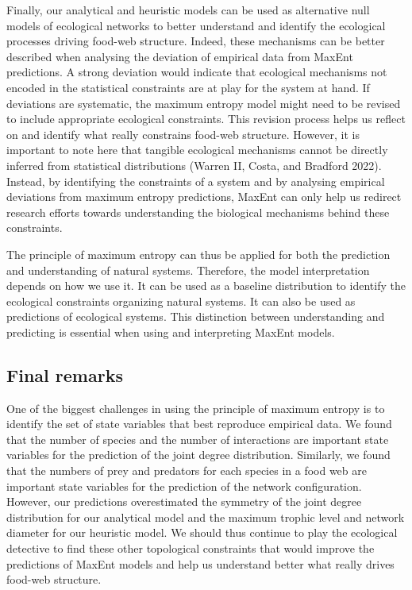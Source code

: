 \documentclass[11pt]{article}
\begin{document}
Finally, our analytical and heuristic models can be used as alternative
null models of ecological networks to better understand and identify the
ecological processes driving food-web structure. Indeed, these
mechanisms can be better described when analysing the deviation of
empirical data from MaxEnt predictions. A strong deviation would
indicate that ecological mechanisms not encoded in the statistical
constraints are at play for the system at hand. If deviations are
systematic, the maximum entropy model might need to be revised to
include appropriate ecological constraints. This revision process helps
us reflect on and identify what really constrains food-web structure.
However, it is important to note here that tangible ecological
mechanisms cannot be directly inferred from statistical distributions
(Warren II, Costa, and Bradford 2022). Instead, by identifying the
constraints of a system and by analysing empirical deviations from
maximum entropy predictions, MaxEnt can only help us redirect research
efforts towards understanding the biological mechanisms behind these
constraints.

The principle of maximum entropy can thus be applied for both the
prediction and understanding of natural systems. Therefore, the model
interpretation depends on how we use it. It can be used as a baseline
distribution to identify the ecological constraints organizing natural
systems. It can also be used as predictions of ecological systems. This
distinction between understanding and predicting is essential when using
and interpreting MaxEnt models.

\hypertarget{final-remarks}{%
\subsection{Final remarks}\label{final-remarks}}

One of the biggest challenges in using the principle of maximum entropy
is to identify the set of state variables that best reproduce empirical
data. We found that the number of species and the number of interactions
are important state variables for the prediction of the joint degree
distribution. Similarly, we found that the numbers of prey and predators
for each species in a food web are important state variables for the
prediction of the network configuration. However, our predictions
overestimated the symmetry of the joint degree distribution for our
analytical model and the maximum trophic level and network diameter for
our heuristic model. We should thus continue to play the ecological
detective to find these other topological constraints that would improve
the predictions of MaxEnt models and help us understand better what
really drives food-web structure.
\end{document}
